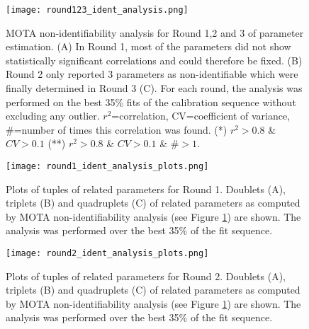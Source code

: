 \begin{figure}[tb]
	\begin{center}
		\texttt{[image: round123\_ident\_analysis.png]}
		\caption[MOTA non-identifiability analysis for Round 1,2 and 3 of parameter estimation]{MOTA non-identifiability analysis for Round 1,2 and 3 of parameter estimation. (A) In Round 1, most of the parameters did not show statistically significant correlations and could therefore be fixed. (B) Round 2 only reported 3 parameters as non-identifiable which were finally determined in Round 3 (C). For each round, the analysis was performed on the best 35\% fits of the calibration sequence without excluding any outlier. $r^2$=correlation, CV=coefficient of variance, \#=number of times this correlation was found. (*) $r^2 > 0.8$ \& $CV > 0.1$  (**) $r^2 > 0.8$ \& $CV > 0.1$ \& \#$> 1$.}
		\label{fig:project3_round123_ident_analysis}
	\end{center}
\end{figure}
\clearpage

\begin{figure}[tb]
	\begin{center}
		\texttt{[image: round1\_ident\_analysis\_plots.png]}
		\caption[Plots of tuples of related parameters for Round 1]{Plots of tuples of related parameters for Round 1. Doublets (A), triplets (B) and quadruplets (C) of related parameters as computed by MOTA non-identifiability analysis (see Figure \ref{fig:project3_round123_ident_analysis}) are shown. The analysis was performed over the best 35\% of the fit sequence.}
		\label{fig:project3_round1_ident_analysis_plots}
	\end{center}
\end{figure}
\clearpage

\begin{figure}[tb]
	\begin{center}
		\texttt{[image: round2\_ident\_analysis\_plots.png]}
		\caption[Plots of tuples of related parameters for Round 2]{Plots of tuples of related parameters for Round 2. Doublets (A), triplets (B) and quadruplets (C) of related parameters as computed by MOTA non-identifiability analysis (see Figure \ref{fig:project3_round123_ident_analysis}) are shown. The analysis was performed over the best 35\% of the fit sequence.}
		\label{fig:project3_round2_ident_analysis_plots}
	\end{center}
\end{figure}
\clearpage

